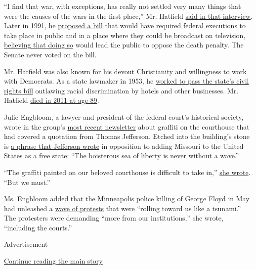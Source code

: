``I find that war, with exceptions, has really not settled very many
things that were the causes of the wars in the first place,'' Mr.
Hatfield \href{https://www.newspapers.com/newspage/442485597/}{said in
that interview}. Later in 1991, he
\href{https://www.congress.gov/bill/102nd-congress/senate-bill/1155}{proposed
a bill} that would have required federal executions to take place in
public and in a place where they could be broadcast on television,
\href{https://www.nytimes.com/1991/05/03/opinion/pictures-at-an-execution.html}{believing
that doing so} would lead the public to oppose the death penalty. The
Senate never voted on the bill.

Mr. Hatfield was also known for his devout Christianity and willingness
to work with Democrats. As a state lawmaker in 1953, he
\href{https://oregonhistoryproject.org/articles/historical-records/signing-oregon39s-civil-rights-bill-1953}{worked
to pass the state's civil rights bill} outlawing racial discrimination
by hotels and other businesses. Mr. Hatfield
\href{https://www.nytimes.com/2011/08/08/us/politics/08hatfield.html}{died
in 2011 at age 89}.

Julie Engbloom, a lawyer and president of the federal court's historical
society, wrote in the group's
\href{https://usdchs.org/wp-content/uploads/2020/07/benchmarks_spring2020_rev-final-web.pdf}{most
recent newsletter} about graffiti on the courthouse that had covered a
quotation from Thomas Jefferson. Etched into the building's stone is
\href{http://www.digitalhistory.uh.edu/disp_textbook.cfm?smtID=3\&psid=230}{a
phrase that Jefferson wrote} in opposition to adding Missouri to the
United States as a free state: ``The boisterous sea of liberty is never
without a wave.''

``The graffiti painted on our beloved courthouse is difficult to take
in,''
\href{https://usdchs.org/wp-content/uploads/2020/07/benchmarks_spring2020_rev-final-web.pdf}{she
wrote}. ``But we must.''

Ms. Engbloom added that the Minneapolis police killing of
\href{https://www.nytimes.com/article/george-floyd-who-is.html}{George
Floyd} in May had unleashed a
\href{https://www.nytimes.com/news-event/george-floyd-protests-minneapolis-new-york-los-angeles}{wave
of protests} that were ``rolling toward us like a tsunami.'' The
protesters were demanding ``more from our institutions,'' she wrote,
``including the courts.''

Advertisement

\protect\hyperlink{after-bottom}{Continue reading the main story}

